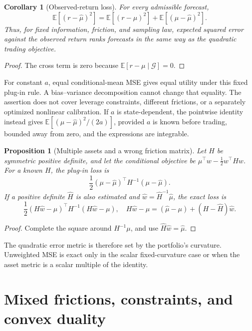 \documentclass[11pt]{article}
\theoremstyle{plain}
\newtheorem{proposition}[theorem]{Proposition}
\newtheorem{corollary}[theorem]{Corollary}
\theoremstyle{definition}
\theoremstyle{remark}
\newcommand{\E}{\mathbb E}
\begin{document}
\begin{corollary}[Observed-return loss]\label{cor:observedmse}
For every admissible forecast,
\[
\E[(r-\widehat\mu)^2]=\E[(r-\mu)^2]+\E[(\mu-\widehat\mu)^2].
\]
Thus, for fixed information, friction, and sampling law, expected
squared error against the observed return ranks forecasts in the same
way as the quadratic trading objective.
\end{corollary}
\begin{proof}
The cross term is zero because \(\E[r-\mu\mid\mathcal G]=0\).
\end{proof}

For constant \(a\), equal conditional-mean MSE gives equal utility under
this fixed plug-in rule. A bias--variance decomposition cannot change
that equality. The assertion does not cover leverage constraints,
different frictions, or a separately optimized nonlinear calibration.
If \(a\) is state-dependent, the pointwise identity instead gives
\(\E[(\mu-\widehat\mu)^2/(2a)]\), provided \(a\) is known before trading,
bounded away from zero, and the expressions are integrable.

\begin{proposition}[Multiple assets and a wrong friction matrix]\label{prop:matrix}
Let \(H\) be symmetric positive definite, and let the conditional
objective be \(\mu^\top w-\frac12w^\top H w\).
For a known \(H\), the plug-in loss is
\[
\frac12(\mu-\widehat\mu)^\top H^{-1}(\mu-\widehat\mu).
\]
If a positive definite \(\widehat H\) is also estimated and
\(\widehat w=\widehat H^{-1}\widehat\mu\), the exact loss is
\begin{equation}\label{eq:frictionerror}
\frac12(H\widehat w-\mu)^\top H^{-1}(H\widehat w-\mu),
\quad
H\widehat w-\mu=(\widehat\mu-\mu)+(H-\widehat H)\widehat w.
\end{equation}
\end{proposition}
\begin{proof}
Complete the square around \(H^{-1}\mu\), and use
\(\widehat H\widehat w=\widehat\mu\).
\end{proof}

The quadratic error metric is therefore set by the portfolio's curvature.
Unweighted MSE is exact only in the scalar fixed-curvature case or when
the asset metric is a scalar multiple of the identity.

\section{Mixed frictions, constraints, and convex duality}
\end{document}
